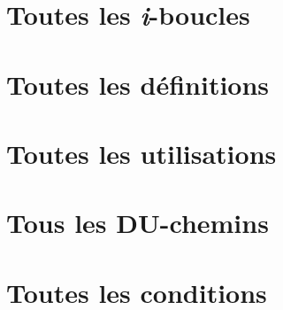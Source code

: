 \documentclass[a4paper, 12pt]{report}
\begin{document}
\section{Toutes les \textit{i}-boucles}
\section{Toutes les définitions}
\section{Toutes les utilisations}
\section{Tous les DU-chemins}
\section{Toutes les conditions}
\end{document}
